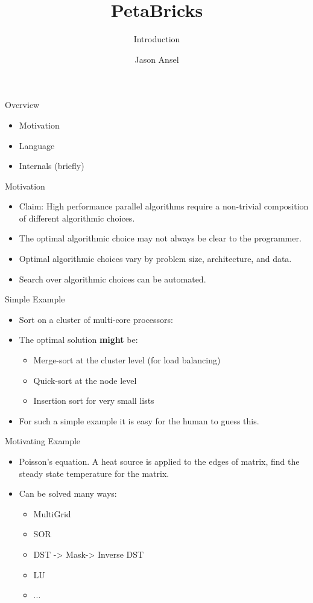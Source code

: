 \documentclass[pdf,blends]{prosper}
\title{PetaBricks}
\subtitle{Introduction}
\author{Jason Ansel}
\begin{document}
\maketitle

\begin{slide}{Overview}
\begin{itemize}
\item Motivation
\item Language
\item Internals (briefly) 
\end{itemize}
\end{slide}

\begin{slide}{Motivation}
\begin{itemize}
\item Claim: High performance parallel algorithms require a non-trivial composition of different algorithmic choices.
\item The optimal algorithmic choice may not always be clear to the programmer.
\item Optimal algorithmic choices vary by problem size, architecture, and data.
\item Search over algorithmic choices can be automated.
\end{itemize}
\end{slide}

\begin{slide}{Simple Example}
\begin{itemize}
\item Sort on a cluster of multi-core processors:
\item The optimal solution {\bf might} be:
  \begin{itemize}
  \item Merge-sort at the cluster level (for load balancing)
  \item Quick-sort at the node level
  \item Insertion sort for very small lists
  \end{itemize}
\item For such a simple example it is easy for the human to guess this.
\end{itemize}
\end{slide}

\begin{slide}{Motivating Example}
\begin{itemize}
\item Poisson's equation.  A heat source is applied to the edges of matrix, find the steady state temperature for the matrix.
\item Can be solved many ways:
  \begin{itemize}
  \item MultiGrid
  \item SOR
  \item DST -> Mask-> Inverse DST
  \item LU
  \item ... 
  \end{itemize}
\end{itemize}
\end{slide}
\end{document}
